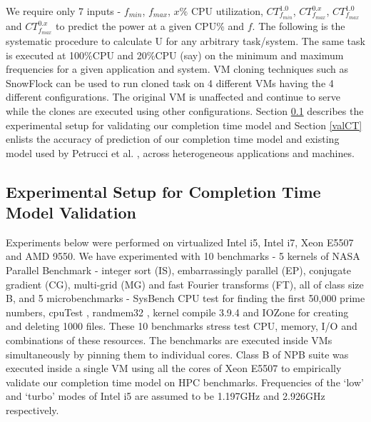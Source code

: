 \documentclass{sig-alternate}
\begin{document}
We require only 7 inputs - $f_{min}$, $f_{max}$, $x\%$ CPU utilization, $ CT^{1.0}_{f_{min}}$, $CT^{0.x}_{f_{max}}$, $CT^{1.0}_{f_{max}}$ and $CT^{0.x}_{f_{max}}$ to predict the power at a given CPU\% and $f$. The following is the systematic procedure to calculate U for any arbitrary task/system. The same task is executed at 100\%CPU and 20\%CPU (say) on the minimum and maximum frequencies for a given application and system. VM cloning techniques such as SnowFlock \cite{SnowFlock} can be used to run cloned task on 4 different VMs having the 4 different configurations. The original VM is unaffected and continue to serve while the clones are executed using other configurations. Section \ref{expCTV} describes the experimental setup for validating our completion time model and Section \ref{valCT} enlists the accuracy of prediction of our completion time model and existing model used by Petrucci et al. \cite{Petrucci2011}, across heterogeneous applications and machines.
\subsection{Experimental Setup for Completion Time Model Validation}
\label{expCTV}

Experiments below were performed on virtualized Intel i5, Intel i7, Xeon E5507 and AMD 9550. We have experimented with 10  benchmarks - 5 kernels of NASA Parallel Benchmark \cite{nasa} - integer sort (IS), embarrassingly parallel (EP), conjugate gradient (CG), multi-grid (MG) and fast Fourier transforms (FT), all of class size B, and 5 microbenchmarks - SysBench CPU test \cite{sysbench} for finding the first 50,000 prime numbers, cpuTest \cite{cputest}, randmem32 \cite{randmem}, kernel compile 3.9.4 \cite{kc} and IOZone \cite{iozone} for creating and deleting 1000 files. These 10 benchmarks stress test CPU, memory, I/O and combinations of these resources. The benchmarks are executed inside VMs simultaneously by pinning them to individual cores. Class B of NPB suite was executed inside a single VM using all the cores of Xeon E5507 to empirically validate our completion time model on HPC benchmarks. Frequencies of the `low' and `turbo' modes of Intel i5 are assumed to be 1.197GHz and 2.926GHz respectively. 
\end{document}
